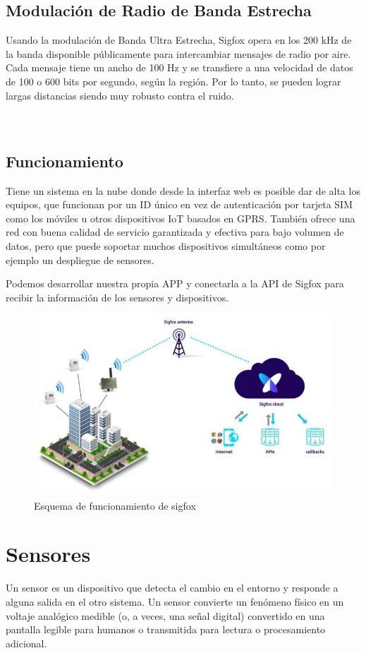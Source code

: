 \documentclass[12pt]{book}
\begin{document}
\subsection{Modulación de Radio de Banda Estrecha}
Usando la modulación de Banda Ultra Estrecha, Sigfox opera en los 200 kHz de la banda disponible públicamente para intercambiar mensajes de radio por aire. Cada mensaje tiene un ancho de 100 Hz y se transfiere a una velocidad de datos de 100 o 600 bits por segundo, según la región. Por lo tanto, se pueden lograr largas distancias siendo muy robusto contra el ruido.\cite{Sigfox} \\
\\
\\
\subsection{Funcionamiento}
Tiene un sistema en la nube donde desde la interfaz web es posible dar de alta los equipos, que funcionan por un ID único en vez de autenticación por tarjeta SIM como los móviles u otros dispositivos IoT basados en GPRS.
También ofrece una red con buena calidad de servicio garantizada y efectiva para bajo volumen de datos, pero que puede soportar muchos dispositivos simultáneos como por ejemplo un despliegue de sensores.

Podemos desarrollar nuestra propia APP y conectarla a la API de Sigfox para recibir la información de los sensores y dispositivos.
\begin{figure}[h]
	\centering
	\includegraphics[width=0.5\linewidth]{imagenes/esquemasigfox}
	\caption[funcionamiento sigfox ]{Esquema de funcionamiento de sigfox}
	\label{fig:esquema}
\end{figure}
\vspace{10cm}



\section{Sensores}

Un sensor es un dispositivo que detecta el cambio en el entorno y responde a alguna salida en el otro sistema. Un sensor convierte un fenómeno físico en un voltaje analógico medible (o, a veces, una señal digital) convertido en una pantalla legible para humanos o transmitida para lectura o procesamiento adicional. \\
\end{document}
